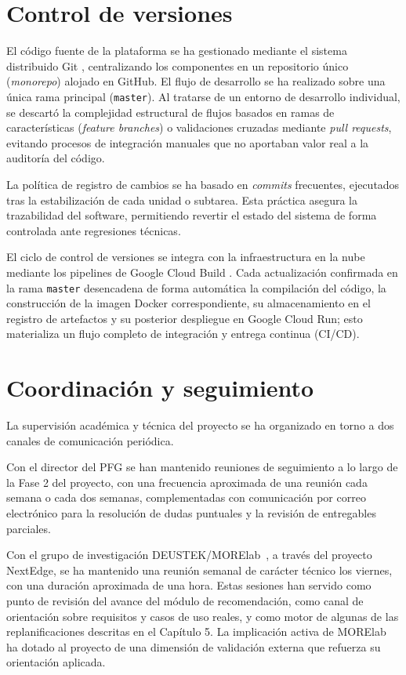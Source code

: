 \section{Control de versiones}

El código fuente de la plataforma se ha gestionado mediante el sistema distribuido Git \cite{git_scm2026,github2026},
centralizando los componentes en un repositorio único (\textit{monorepo}) alojado en GitHub.
El flujo de desarrollo se ha realizado sobre una única rama principal (\texttt{master}).
Al tratarse de un entorno de desarrollo individual, se descartó la complejidad estructural de flujos basados
en ramas de características (\textit{feature branches}) o validaciones cruzadas mediante \textit{pull requests},
evitando procesos de integración manuales que no aportaban valor real a la auditoría del código.

La política de registro de cambios se ha basado en \textit{commits} frecuentes, ejecutados tras
la estabilización de cada unidad o subtarea. Esta práctica asegura la trazabilidad del software,
permitiendo revertir el estado del sistema de forma controlada ante regresiones técnicas.

El ciclo de control de versiones se integra con la infraestructura en la nube
mediante los pipelines de Google Cloud Build \cite{cloud_build2026}.
Cada actualización confirmada en la rama \texttt{master} desencadena de forma automática la compilación del código,
la construcción de la imagen Docker correspondiente, su almacenamiento en el registro de artefactos y su posterior
despliegue en Google Cloud Run; esto materializa un flujo completo de integración y entrega continua (CI/CD).

\section{Coordinación y seguimiento}

La supervisión académica y técnica del proyecto se ha organizado en torno a dos canales
de comunicación periódica.

Con el director del PFG se han mantenido reuniones de seguimiento a lo largo de la Fase
2 del proyecto, con una frecuencia aproximada de una reunión cada semana o cada dos semanas, complementadas
con comunicación por correo electrónico para la resolución de dudas puntuales y
la revisión de entregables parciales.

Con el grupo de investigación DEUSTEK/MORElab~\cite{MORElab2026}, a través del proyecto
NextEdge, se ha mantenido una reunión semanal de carácter técnico los viernes, con una
duración aproximada de una hora. Estas sesiones han servido como punto de revisión del
avance del módulo de recomendación, como canal de orientación sobre requisitos y casos
de uso reales, y como motor de algunas de las replanificaciones descritas en el Capítulo 5.
La implicación activa de MORElab ha dotado al proyecto de una dimensión de validación externa
que refuerza su orientación aplicada.
